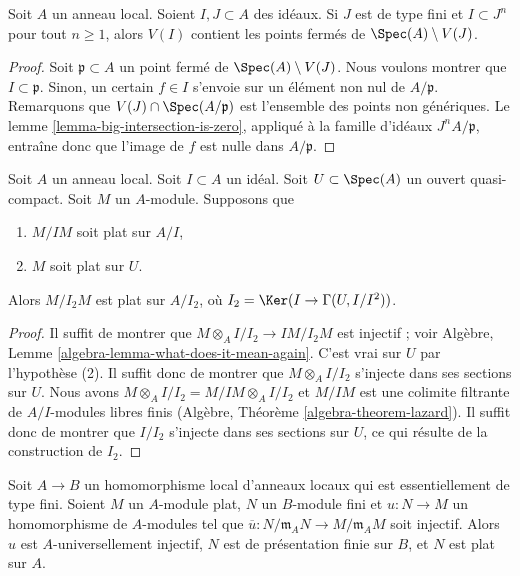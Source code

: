 \begin{lemma}
\label{lemma-closed-points-complement}
Soit $A$ un anneau local. Soient $I, J \subset A$ des idéaux.
Si $J$ est de type fini et $I \subset J^n$ pour tout $n \geq 1$,
alors $V(I)$ contient les points fermés de $\Spec(A) \setminus V(J)$.
\end{lemma}

\begin{proof}
Soit $\mathfrak p \subset A$ un point fermé de $\Spec(A) \setminus V(J)$.
Nous voulons montrer que $I \subset \mathfrak p$. Sinon, un certain $f \in I$
s'envoie sur un élément non nul de $A/\mathfrak p$. Remarquons que
$V(J) \cap \Spec(A/\mathfrak p)$ est l'ensemble des points non génériques.
Le lemme \ref{lemma-big-intersection-is-zero}, appliqué
à la famille d'idéaux $J^nA/\mathfrak p$, entraîne donc que
l'image de $f$ est nulle dans $A/\mathfrak p$.
\end{proof}

\begin{lemma}
\label{lemma-make-smaller-flatness-ideal}
Soit $A$ un anneau local. Soit $I \subset A$ un idéal.
Soit $U \subset \Spec(A)$ un ouvert quasi-compact.
Soit $M$ un $A$-module. Supposons que
\begin{enumerate}
\item $M/IM$ soit plat sur $A/I$,
\item $M$ soit plat sur $U$.
\end{enumerate}
Alors $M/I_2M$ est plat sur $A/I_2$, où
$I_2 = \Ker(I \to \Gamma(U, I/I^2))$.
\end{lemma}

\begin{proof}
Il suffit de montrer que
$M \otimes_A I/I_2 \to IM/I_2M$ est injectif ; voir
Algèbre, Lemme \ref{algebra-lemma-what-does-it-mean-again}.
C'est vrai sur $U$ par l'hypothèse (2). Il suffit donc de montrer
que $M \otimes_A I/I_2$ s'injecte dans ses sections sur $U$.
Nous avons $M \otimes_A I/I_2 = M/IM \otimes_A I/I_2$ et
$M/IM$ est une colimite filtrante de $A/I$-modules libres finis
(Algèbre, Théorème \ref{algebra-theorem-lazard}).
Il suffit donc de montrer que $I/I_2$ s'injecte dans ses sections
sur $U$, ce qui résulte de la construction de $I_2$.
\end{proof}

\begin{proposition}
\label{proposition-finite-type-injective-into-flat-mod-m}
Soit $A \to B$ un homomorphisme local d'anneaux locaux
qui est essentiellement de type fini. Soient $M$ un $A$-module plat,
$N$ un $B$-module fini et $u : N \to M$ un homomorphisme de $A$-modules tel que
$\overline{u} : N/\mathfrak m_AN \to M/\mathfrak m_AM$ soit injectif.
Alors $u$ est $A$-universellement injectif, $N$ est de présentation finie sur
$B$, et $N$ est plat sur $A$.
\end{proposition}

